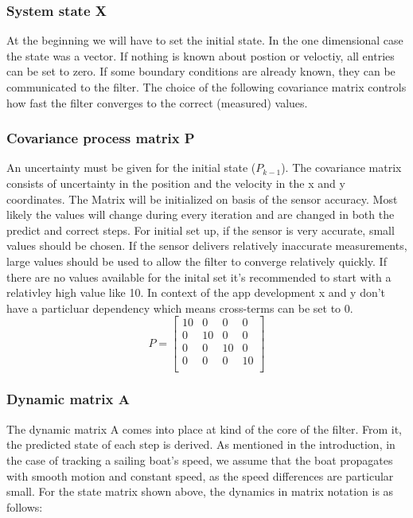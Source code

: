 \subsubsection{System state X}
At the beginning we will have to set the initial state. In the one dimensional case
the state was a vector.
If nothing is known about postion or veloctiy, all entries can be set to zero. If some boundary conditions are already known, they can be communicated to the filter. The choice of the following covariance matrix controls how fast the filter converges to the correct (measured) values.

\subsubsection{Covariance process matrix P}
An uncertainty must be given for the initial state ($P_{k-1}$). The covariance matrix consists of uncertainty in the position and the velocity in the x and y coordinates. The Matrix will be initialized on basis of the sensor accuracy. Most likely the values will change during every iteration and are changed in both the predict and correct steps. 
For initial set up, if the sensor is very accurate, small values should be chosen. If the sensor delivers relatively inaccurate measurements, large values should be used to allow the filter to converge relatively quickly. 
If there are no values available for the inital set it's recommended to start with a relativley high value like 10. In context of the app development x and y don't have a particluar dependency which means cross-terms can be set to 0.
\begin{equation}
P = \begin{bmatrix} 
10 & 0 & 0 & 0 \\
0 & 10 & 0 & 0 \\
0 & 0 & 10 & 0 \\
0 & 0 & 0 & 10 \\
\end{bmatrix}
\end{equation}


\subsubsection{Dynamic matrix A}
The dynamic matrix A comes into place at kind of the core of the filter. From it, the predicted state of each step is derived. As mentioned in the introduction, in the case of tracking a sailing boat's speed, we assume that the boat propagates with smooth motion and constant speed, as the speed differences are particular small. 
For the state matrix shown above, the dynamics in matrix notation is as follows:


